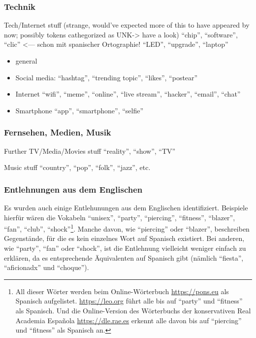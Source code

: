 \subsubsection{Technik}
  \item Tech/Internet stuff (strange, would've expected more of this to have appeared by now; possibly tokens cathegorized as UNK-> have a look)
      ``chip'', ``software'', ``clic'' <--- schon mit spanischer Ortographie!
        ``LED'', ``upgrade'', ``laptop''
    \begin{itemize}
      \item general
      \item Social media:
          ``hashtag'', ``trending topic'', ``likes'', ``postear''
      \item Internet
          ``wifi'', ``meme'', ``online'', ``live stream'', ``hacker'', ``email'', ``chat''
      \item Smartphone
          ``app'', ``smartphone'', ``selfie''
    \end{itemize}

\subsubsection{Fernsehen, Medien, Musik}
  \item Further TV/Media/Movies stuff
      ``reality'', ``show'', ``TV''
  \item Music stuff
      ``country'', ``pop'', ``folk'', ``jazz'', etc.

\subsubsection{Entlehnungen aus dem Englischen}
Es wurden auch einige Entlehunungen aus dem Englischen identifiziert.
Beispiele hierfür wären die Vokabeln ``unisex'', ``party'', ``piercing'', ``fitness'', ``blazer'', ``fan'', ``club'', ``shock''\footnote{All dieser Wörter werden beim Online-Wörterbuch \url{https://pons.eu} als Spanisch aufgelistet. \url{https://leo.org} führt alle bis auf ``party'' und ``fitness'' als Spanisch. Und die Online-Version des Wörterbuchs der konservativen Real Academia Española \url{https://dle.rae.es} erkennt alle davon bis auf ``piercing'' und ``fitness'' als Spanisch an.}.
Manche davon, wie ``piercing'' oder ``blazer'', beschreiben Gegenstände, für die es kein einzelnes Wort auf Spanisch existiert.
Bei anderen, wie ``party'', ``fan'' oder ``shock'',  ist die Entlehnung vielleicht weniger einfach zu erklären, da es entsprechende Äquivalenten auf Spanisch gibt (nämlich ``fiesta'', ``aficionadx'' und ``choque''). %

